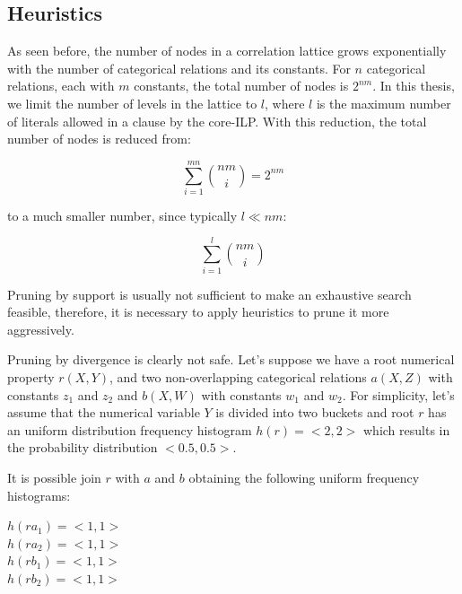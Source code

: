 \subsection{Heuristics}
\label{sec:heuristics}

As seen before, the number of nodes in a correlation lattice grows exponentially with the number of categorical
relations and its constants. For $n$ categorical relations, each with $m$ constants, the total number of nodes is
$2^{nm}$. In this thesis, we limit the number of levels in the lattice to $l$, where $l$ is the maximum number of
literals allowed in a clause by the core-ILP. With this reduction, the total number of nodes is reduced from:

\begin{center}
  \begin{equation}
    \sum_{i=1}^{mn}\binom{nm}{i} = 2^{nm}
  \end{equation}
\end{center}

to a much smaller number, since typically $l \ll nm$:

\begin{center}
  \begin{equation}
    \sum_{i=1}^{l}\binom{nm}{i}
  \end{equation}
\end{center}

Pruning by support is usually not sufficient to make an exhaustive search feasible, therefore, it is necessary to apply
heuristics to prune it more aggressively.


Pruning by divergence is clearly not safe. Let's suppose we have a root numerical property $r(X,Y)$, and two
non-overlapping categorical relations $a(X,Z)$ with constants $z_1$ and $z_2$ and $b(X,W)$ with constants $w_1$ and
$w_2$. For simplicity, let's assume that the numerical variable $Y$ is divided into two buckets and root $r$ has an
uniform distribution frequency histogram $h(r)=<2,2>$ which results in the probability distribution $<0.5,0.5>$.

It is possible join $r$ with $a$ and $b$ obtaining the following uniform frequency histograms:

\begin{center}
$h(ra_1)=<1,1>$ \\
$h(ra_2)=<1,1>$ \\
$h(rb_1)=<1,1>$ \\
$h(rb_2)=<1,1>$
\end{center}

